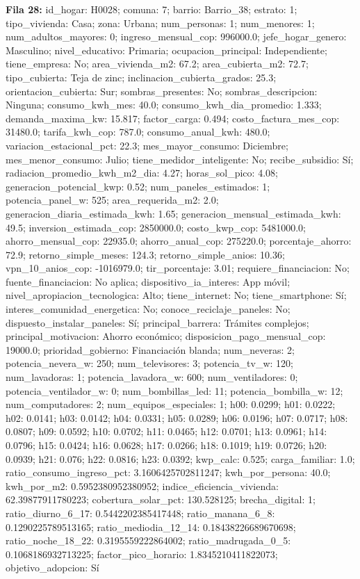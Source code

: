 {\footnotesize\textbf{Fila 28:} id\_hogar: H0028; comuna: 7; barrio: Barrio\_38; estrato: 1; tipo\_vivienda: Casa; zona: Urbana; num\_personas: 1; num\_menores: 1; num\_adultos\_mayores: 0; ingreso\_mensual\_cop: 996000.0; jefe\_hogar\_genero: Masculino; nivel\_educativo: Primaria; ocupacion\_principal: Independiente; tiene\_empresa: No; area\_vivienda\_m2: 67.2; area\_cubierta\_m2: 72.7; tipo\_cubierta: Teja de zinc; inclinacion\_cubierta\_grados: 25.3; orientacion\_cubierta: Sur; sombras\_presentes: No; sombras\_descripcion: Ninguna; consumo\_kwh\_mes: 40.0; consumo\_kwh\_dia\_promedio: 1.333; demanda\_maxima\_kw: 15.817; factor\_carga: 0.494; costo\_factura\_mes\_cop: 31480.0; tarifa\_kwh\_cop: 787.0; consumo\_anual\_kwh: 480.0; variacion\_estacional\_pct: 22.3; mes\_mayor\_consumo: Diciembre; mes\_menor\_consumo: Julio; tiene\_medidor\_inteligente: No; recibe\_subsidio: Sí; radiacion\_promedio\_kwh\_m2\_dia: 4.27; horas\_sol\_pico: 4.08; generacion\_potencial\_kwp: 0.52; num\_paneles\_estimados: 1; potencia\_panel\_w: 525; area\_requerida\_m2: 2.0; generacion\_diaria\_estimada\_kwh: 1.65; generacion\_mensual\_estimada\_kwh: 49.5; inversion\_estimada\_cop: 2850000.0; costo\_kwp\_cop: 5481000.0; ahorro\_mensual\_cop: 22935.0; ahorro\_anual\_cop: 275220.0; porcentaje\_ahorro: 72.9; retorno\_simple\_meses: 124.3; retorno\_simple\_anios: 10.36; vpn\_10\_anios\_cop: -1016979.0; tir\_porcentaje: 3.01; requiere\_financiacion: No; fuente\_financiacion: No aplica; dispositivo\_ia\_interes: App móvil; nivel\_apropiacion\_tecnologica: Alto; tiene\_internet: No; tiene\_smartphone: Sí; interes\_comunidad\_energetica: No; conoce\_reciclaje\_paneles: No; dispuesto\_instalar\_paneles: Sí; principal\_barrera: Trámites complejos; principal\_motivacion: Ahorro económico; disposicion\_pago\_mensual\_cop: 19000.0; prioridad\_gobierno: Financiación blanda; num\_neveras: 2; potencia\_nevera\_w: 250; num\_televisores: 3; potencia\_tv\_w: 120; num\_lavadoras: 1; potencia\_lavadora\_w: 600; num\_ventiladores: 0; potencia\_ventilador\_w: 0; num\_bombillas\_led: 11; potencia\_bombilla\_w: 12; num\_computadores: 2; num\_equipos\_especiales: 1; h00: 0.0299; h01: 0.0222; h02: 0.0141; h03: 0.0142; h04: 0.0331; h05: 0.0289; h06: 0.0196; h07: 0.0717; h08: 0.0807; h09: 0.0592; h10: 0.0702; h11: 0.0465; h12: 0.0701; h13: 0.0961; h14: 0.0796; h15: 0.0424; h16: 0.0628; h17: 0.0266; h18: 0.1019; h19: 0.0726; h20: 0.0939; h21: 0.076; h22: 0.0816; h23: 0.0392; kwp\_calc: 0.525; carga\_familiar: 1.0; ratio\_consumo\_ingreso\_pct: 3.1606425702811247; kwh\_por\_persona: 40.0; kwh\_por\_m2: 0.5952380952380952; indice\_eficiencia\_vivienda: 62.39877911780223; cobertura\_solar\_pct: 130.528125; brecha\_digital: 1; ratio\_diurno\_6\_17: 0.5442202385417448; ratio\_manana\_6\_8: 0.1290225789513165; ratio\_mediodia\_12\_14: 0.18438226689670698; ratio\_noche\_18\_22: 0.3195559222864002; ratio\_madrugada\_0\_5: 0.1068186932713225; factor\_pico\_horario: 1.8345210411822073; objetivo\_adopcion: Sí\par}

